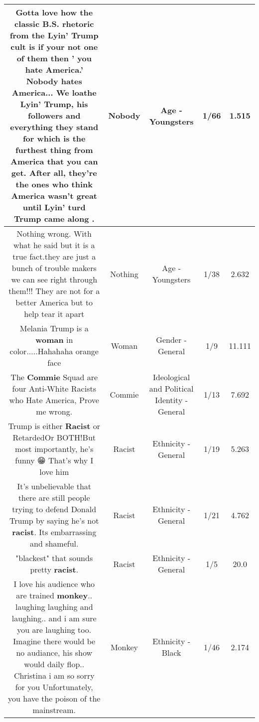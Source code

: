 \documentclass[11pt]{article}
\newlength\mylength
\begin{document}
\begin{center}
\begin{longtable}{|C{.65\mylength}|C{.30\mylength}|C{.12\mylength}|C{.12\mylength}|C{.12\mylength}|}
  \small Gotta love how the classic B.S. rhetoric from the Lyin' Trump cult is if your not one of them then ' you hate America.' \textbf{Nobody} hates America... We loathe Lyin' Trump,  his followers and everything they stand for which is the furthest thing from America that you can get. After all, they're the ones who think America wasn't great until Lyin' turd Trump came along .\normalsize   & Nobody & Age - Youngsters & 1/66 & 1.515 \\  \hline
  \small Nothing wrong. With what he said but it is a true fact.they are just a bunch of trouble makers we can see right through them!!! They are not for a better America but to help tear it apart\normalsize   & Nothing & Age - Youngsters & 1/38 & 2.632 \\  \hline
  \small Melania Trump is a \textbf{woman} in color.....Hahahaha orange face\normalsize   & Woman & Gender - General & 1/9 & 11.111 \\  \hline
  \small The \textbf{Commie} Squad are four Anti-White Racists who Hate America, Prove me wrong.\normalsize   & Commie &  Ideological and Political Identity - General & 1/13 & 7.692 \\  \hline
  \small Trump is either \textbf{Racist} or RetardedOr BOTH!But most importantly, he's funny 😁 That's why I love him\normalsize   & Racist & Ethnicity - General & 1/19 & 5.263 \\  \hline
  \small It's unbelievable that there are still people trying to defend Donald Trump by saying he's not \textbf{racist}. Its embarrassing and shameful.\normalsize   & Racist & Ethnicity - General & 1/21 & 4.762 \\  \hline
  \small "blackest" that sounds pretty \textbf{racist}.\normalsize   & Racist & Ethnicity - General & 1/5 & 20.0 \\  \hline
  \small I love his audience who are trained \textbf{monkey}.. laughing laughing and laughing.. and i am sure you are laughing too. Imagine there would be no audiance, his show would daily flop.. Christina i am so sorry for you Unfortunately, you have the poison of the mainstream.\normalsize   & Monkey & Ethnicity - Black & 1/46 & 2.174 \\  \hline

\end{longtable}
\end{center}
\end{document}
